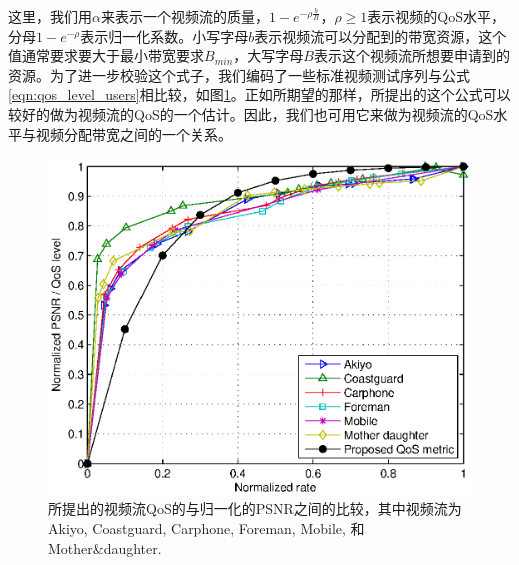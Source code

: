 这里，我们用$\alpha$来表示一个视频流的质量，$1- e^{-\rho \frac{b}{B}}，\rho \ge 1$表示视频的QoS水平，分母${1-e^{-\rho}}$表示归一化系数。小写字母$b$表示视频流可以分配到的带宽资源，这个值通常要求要大于最小带宽要求$B_{min}$，大写字母$B$表示这个视频流所想要申请到的资源。为了进一步校验这个式子，我们编码了一些标准视频测试序列与公式\ref{eqn:qos_level_users}相比较，如图\ref{fig_qos_rate_cac}。正如所期望的那样，所提出的这个公式可以较好的做为视频流的QoS的一个估计。因此，我们也可用它来做为视频流的QoS水平与视频分配带宽之间的一个关系。
\begin{figure}[tb]
\begin{center}
\includegraphics[scale=0.7] {qos_rate_cac.eps}
\end{center}
\caption{所提出的视频流QoS的与归一化的PSNR之间的比较，其中视频流为 Akiyo, Coastguard, Carphone, Foreman, Mobile, 和 Mother\&daughter. } 
\label{fig_qos_rate_cac}
\end{figure}

